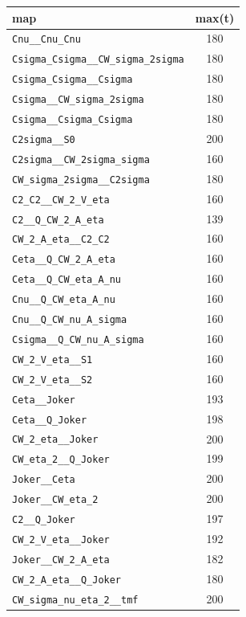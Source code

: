 \begin{table}\begin{tabular}{|l|c|}\hline
map & max(t)\\\hline
\texttt{Cnu\_\_Cnu\_Cnu} & 180\\\hline
\texttt{Csigma\_Csigma\_\_CW\_sigma\_2sigma} & 180\\\hline
\texttt{Csigma\_Csigma\_\_Csigma} & 180\\\hline
\texttt{Csigma\_\_CW\_sigma\_2sigma} & 180\\\hline
\texttt{Csigma\_\_Csigma\_Csigma} & 180\\\hline
\texttt{C2sigma\_\_S0} & 200\\\hline
\texttt{C2sigma\_\_CW\_2sigma\_sigma} & 160\\\hline
\texttt{CW\_sigma\_2sigma\_\_C2sigma} & 180\\\hline
\texttt{C2\_C2\_\_CW\_2\_V\_eta} & 160\\\hline
\texttt{C2\_\_Q\_CW\_2\_A\_eta} & 139\\\hline
\texttt{CW\_2\_A\_eta\_\_C2\_C2} & 160\\\hline
\texttt{Ceta\_\_Q\_CW\_2\_A\_eta} & 160\\\hline
\texttt{Ceta\_\_Q\_CW\_eta\_A\_nu} & 160\\\hline
\texttt{Cnu\_\_Q\_CW\_eta\_A\_nu} & 160\\\hline
\texttt{Cnu\_\_Q\_CW\_nu\_A\_sigma} & 160\\\hline
\texttt{Csigma\_\_Q\_CW\_nu\_A\_sigma} & 160\\\hline
\texttt{CW\_2\_V\_eta\_\_S1} & 160\\\hline
\texttt{CW\_2\_V\_eta\_\_S2} & 160\\\hline
\texttt{Ceta\_\_Joker} & 193\\\hline
\texttt{Ceta\_\_Q\_Joker} & 198\\\hline
\texttt{CW\_2\_eta\_\_Joker} & 200\\\hline
\texttt{CW\_eta\_2\_\_Q\_Joker} & 199\\\hline
\texttt{Joker\_\_Ceta} & 200\\\hline
\texttt{Joker\_\_CW\_eta\_2} & 200\\\hline
\texttt{C2\_\_Q\_Joker} & 197\\\hline
\texttt{CW\_2\_V\_eta\_\_Joker} & 192\\\hline
\texttt{Joker\_\_CW\_2\_A\_eta} & 182\\\hline
\texttt{CW\_2\_A\_eta\_\_Q\_Joker} & 180\\\hline
\texttt{CW\_sigma\_nu\_eta\_2\_\_tmf} & 200\\\hline

\end{tabular}
\end{table}
